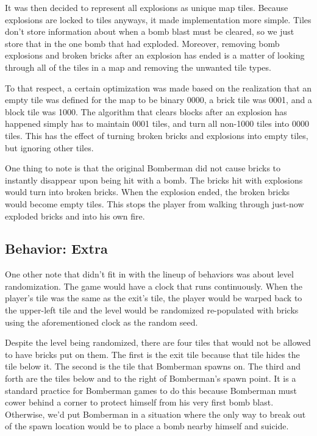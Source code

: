 \documentclass[10pt,a4paper]{article}
\begin{document}
It was then decided to represent all explosions as unique map tiles. Because explosions are locked to tiles anyways, it made implementation more simple. Tiles don't store information about when a bomb blast must be cleared, so we just store that in the one bomb that had exploded. Moreover, removing bomb explosions and broken bricks after an explosion has ended is a matter of looking through all of the tiles in a map and removing the unwanted tile types.

To that respect, a certain optimization was made based on the realization that an empty tile was defined for the map to be binary 0000, a brick tile was 0001, and a block tile was 1000. The algorithm that clears blocks after an explosion has happened simply has to maintain 0001 tiles, and turn all non-1000 tiles into 0000 tiles. This has the effect of turning broken bricks and explosions into empty tiles, but ignoring other tiles.

One thing to note is that the original Bomberman did not cause bricks to instantly disappear upon being hit with a bomb. The bricks hit with explosions would turn into broken bricks. When the explosion ended, the broken bricks would become empty tiles. This stops the player from walking through just-now exploded bricks and into his own fire.

\subsection{Behavior: Extra}

One other note that didn't fit in with the lineup of behaviors was about level randomization. The game would have a clock that runs continuously. When the player's tile was the same as the exit's tile, the player would be warped back to the upper-left tile and the level would be randomized re-populated with bricks using the aforementioned clock as the random seed.

Despite the level being randomized, there are four tiles that would not be allowed to have bricks put on them. The first is the exit tile because that tile hides the tile below it. The second is the tile that Bomberman spawns on. The third and forth are the tiles below and to the right of Bomberman's spawn point. It is a standard practice for Bomberman games to do this because Bomberman must cower behind a corner to protect himself from his very first bomb blast. Otherwise, we'd put Bomberman in a situation where the only way to break out of the spawn location would be to place a bomb nearby himself and suicide.
\end{document}
